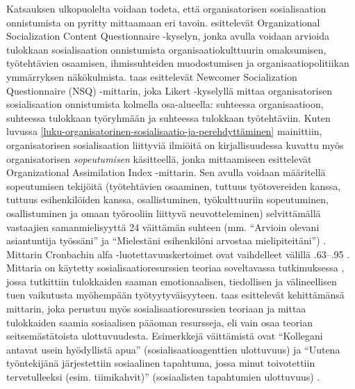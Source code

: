 \documentclass[utf8]{gradu3}
\begin{document}
Katsauksen ulkopuolelta voidaan todeta, että organisatorisen sosialisaation onnistumista on pyritty mittaamaan eri tavoin. \textcite{zhao-ym-2007-mittari} esittelevät Organizational Socialization Content Questionnaire -kyselyn, jonka avulla voidaan arvioida tulokkaan sosialisaation onnistumista organisaatiokulttuurin omaksumisen, työtehtävien osaamisen, ihmissuhteiden muodostumisen ja organisaatiopolitiikan ymmärryksen näkökulmista. \textcite{haueter-ym-2003} taas esittelevät Newcomer Socialization Questionnaire (NSQ) -mittarin, joka Likert -kyselyllä mittaa organisatorisen sosialisaation onnistumista kolmella osa-alueella: suhteessa organisaatioon, suhteessa tulokkaan työryhmään ja suhteessa tulokkaan työtehtäviin. Kuten luvussa \ref{luku-organisatorinen-sosialisaatio-ja-perehdyttäminen} mainittiin, organisatorisen sosialisaation liittyviä ilmiöitä on kirjallisuudessa kuvattu myös organisatorisen \textit{sopeutumisen} käsitteellä, jonka mittaamiseen \textcite{gailliard-ym-2010} esittelevät Organizational Assimilation Index -mittarin. Sen avulla voidaan määritellä sopeutumisen tekijöitä (työtehtävien osaaminen, tuttuus työtovereiden kanssa, tuttuus esihenkilöiden kanssa, osallistuminen, työkulttuuriin sopeutuminen, osallistuminen ja omaan työrooliin liittyvä neuvotteleminen) selvittämällä vastaajien samanmielisyyttä 24 väittämän suhteen (mm. ``Arvioin olevani asiantuntija työssäni” ja “Mielestäni esihenkilöni arvostaa mielipiteitäni'') \parencite{gailliard-ym-2010}. Mittarin Cronbachin alfa -luotettavuuskertoimet ovat vaihdelleet välillä .63--.95 \parencite{gailliard-ym-2010}. Mittaria on käytetty sosialisaatioresurssien teoriaa soveltavassa tutkimuksessa \parencite{cranmer-ym-2016}, jossa tutkittiin tulokkaiden saaman emotionaalisen, tiedollisen ja välineellisen tuen vaikutusta myöhempään työtyytyväisyyteen. \textcite{harris-ym-2022} taas esittelevät kehittämänsä mittarin, joka perustuu myös sosialisaatioresurssien teoriaan ja mittaa tulokkaiden saamia sosiaalisen pääoman resursseja, eli vain osaa teorian seitsemästätoista ulottuvuudesta. Esimerkkejä väittämistä ovat ``Kollegani antavat usein hyödyllistä apua'' (sosialisaatioagenttien ulottuvuus) ja  ``Uutena työntekijänä järjestettiin sosiaalinen tapahtuma, jossa minut toivotettiin tervetulleeksi (esim. tiimikahvit)'' (sosiaalisten tapahtumien ulottuvuus) \parencite{harris-ym-2022}.  
\end{document}
